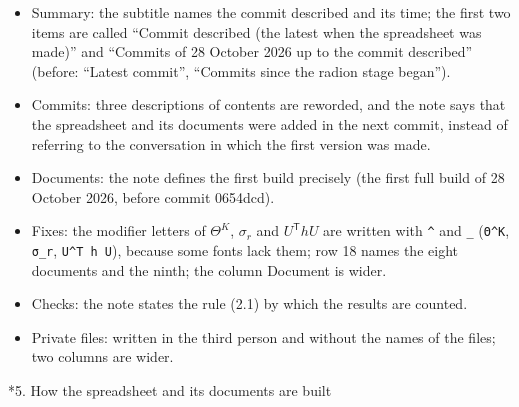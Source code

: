 \documentclass[10pt,a4paper]{article}
\makeatletter
\renewcommand\section{\@startsection{section}{1}{\z@}{-3.5ex \@plus -1ex \@minus -.2ex}{2.3ex \@plus.2ex}{\normalfont\Large\bfseries\raggedright}}
\makeatother
\begin{document}
\begin{itemize}
\item Summary: the subtitle names the commit described and its time; the first two items are called “Commit described (the latest when the spreadsheet was made)” and “Commits of 28 October 2026 up to the commit described” (before: “Latest commit”, “Commits since the radion stage began”).
\item Commits: three descriptions of contents are reworded, and the note says that the spreadsheet and its documents were added in the next commit, instead of referring to the conversation in which the first version was made.
\item Documents: the note defines the first build precisely (the first full build of 28 October 2026, before commit 0654dcd).
\item Fixes: the modifier letters of $\Theta^K$, $\sigma_r$ and $U^{\mathsf T}hU$ are written with \texttt{\textasciicircum{}} and \texttt{\_\allowbreak{}} (\texttt{Θ\textasciicircum{}K}, \texttt{σ\_\allowbreak{}r}, \texttt{U\textasciicircum{}T h U}), because some fonts lack them; row 18 names the eight documents and the ninth; the column Document is wider.
\item Checks: the note states the rule (2.1) by which the results are counted.
\item Private files: written in the third person and without the names of the files; two columns are wider.
\end{itemize}
\section*{5. How the spreadsheet and its documents are built}
\end{document}
